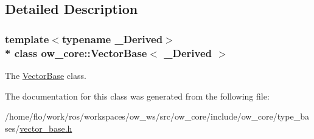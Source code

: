 \subsection{Detailed Description}
\subsubsection*{template$<$typename \+\_\+\+Derived$>$\\*
class ow\+\_\+core\+::\+Vector\+Base$<$ \+\_\+\+Derived $>$}

The \hyperlink{classow__core_1_1VectorBase}{Vector\+Base} class. 

The documentation for this class was generated from the following file\+:\begin{DoxyCompactItemize}
\item 
/home/flo/work/ros/workspaces/ow\+\_\+ws/src/ow\+\_\+core/include/ow\+\_\+core/type\+\_\+bases/\hyperlink{vector__base_8h}{vector\+\_\+base.\+h}\end{DoxyCompactItemize}
